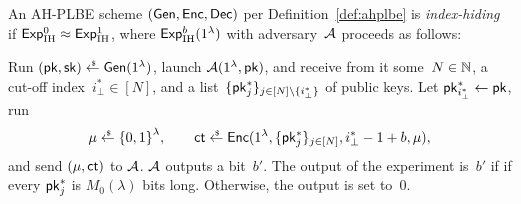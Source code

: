 \begin{definition}\label{def:ahplbe-index-hiding}
An AH-PLBE scheme $(\Gen,\Enc,\Dec)$ per Definition~\ref{def:ahplbe}
is \emph{index-hiding} if ${\ExpIH{0}\approx\ExpIH{1}}$,
where $\ExpIH{b}(1^\lambda)$ with adversary~${\mathcal{A}}$ proceeds as follows:
\begin{security}
Run
${(\pk,\sk)\draws\Gen(1^\lambda)}$,
launch $\scriptA(1^\lambda,\pk)$, and
receive from it
some~${N\in{\mathbb{N}}}$,
a cut-off index~${i_\bot^\ast\in[N]}$, and
a list~$\{\pk^\ast_j\}_{j\in[N]\setminus\{i_\bot^\ast\}}$ of public keys.
Let ${\pk^\ast_{i_\bot^\ast}\gets\pk}$,
run
\begin{align*}
\mu\draws\bit^\lambda,\qquad
\ct\draws\Enc(1^\lambda,\{\pk^\ast_j\}_{j\in[N]},i_\bot^\ast-1+b,\mu),
\end{align*}
and send $(\mu,\ct)$ to ${\mathcal{A}}$.
${\mathcal{A}}$ outputs a bit~$b'$.
The output of the experiment is~$b'$ if
if every $\pk^\ast_j$ is $M_0(\lambda)$ bits long.
Otherwise, the output is set to~$0$.
\end{security}
\end{definition}
